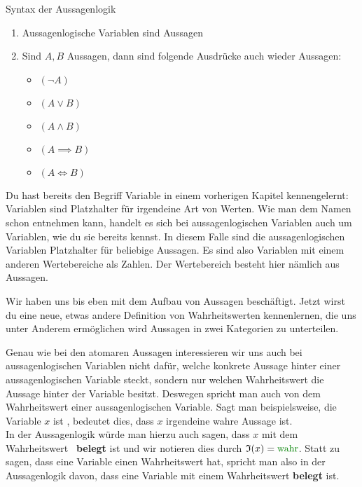 \documentclass[../../main.tex]{subfiles}
\begin{document}
    \begin{definition}{Syntax der Aussagenlogik}
        \begin{enumerate}

            \item Aussagenlogische Variablen sind Aussagen 
            \item Sind $A,B$ Aussagen, dann sind folgende Ausdrücke auch wieder Aussagen:
                \begin{itemize}
                    \item $(\lnot A)$
                    \item $(A \lor B)$
                    \item $(A \land B)$
                    \item $(A \implies B)$
                    \item $(A \iff B)$
                \end{itemize}

        \end{enumerate}
    \end{definition}

    Du hast bereits den Begriff Variable in einem vorherigen Kapitel kennengelernt: Variablen sind 
    Platzhalter für irgendeine Art von Werten. Wie man dem Namen schon entnehmen 
    kann, handelt es sich bei aussagenlogischen Variablen auch um Variablen, wie 
    du sie bereits kennst. In diesem Falle sind die aussagenlogischen Variablen 
    Platzhalter für beliebige Aussagen. Es sind also Variablen mit einem anderen 
    Wertebereiche als Zahlen. Der Wertebereich besteht hier nämlich aus Aussagen.

    \newpage
    Wir haben uns bis eben mit dem Aufbau von Aussagen beschäftigt. 
    Jetzt wirst du eine neue, etwas andere Definition von Wahrheitswerten 
    kennenlernen, die uns unter Anderem ermöglichen wird Aussagen in zwei Kategorien zu unterteilen.


    Genau wie bei den atomaren Aussagen interessieren wir uns auch bei 
    aussagenlogischen Variablen 
    nicht dafür, welche 
    konkrete Aussage hinter einer aussagenlogischen Variable steckt, 
    sondern nur welchen Wahrheitswert die Aussage hinter der Variable besitzt. 
    Deswegen spricht man auch von dem Wahrheitswert einer 
    aussagenlogischen Variable.
    Sagt man beispielsweise, die Variable $x$ ist \wahr, bedeutet dies, 
    dass $x$ irgendeine wahre Aussage ist. \\
    In der Aussagenlogik würde man hierzu auch sagen, dass 
    $x$ mit dem Wahrheitswert \wahr\ \textbf{belegt} ist und wir notieren 
    dies durch $\mathfrak{I}(x) = \wahr$. 
    Statt zu sagen, dass eine Variable einen Wahrheitswert hat, spricht 
    man also in der Aussagenlogik davon, dass eine Variable mit einem Wahrheitswert 
    \textbf{belegt} ist. 
\end{document}

